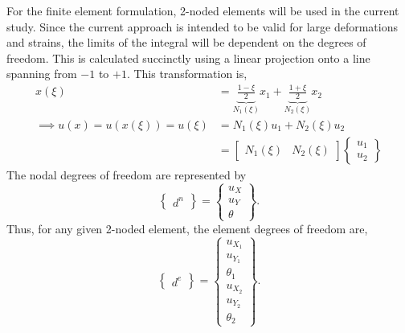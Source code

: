 \documentclass[10pt]{article}
\begin{document}
For the finite element formulation, 2-noded elements will be used in
the current study. Since the current approach is intended to be valid
for large deformations and strains, the limits of the integral will be
dependent on the degrees of freedom. This is calculated succinctly
using a linear projection onto a line spanning from $-1$ to $+1$. This
transformation is,
\begin{align}
  x(\xi) &= \underbrace{\frac{1-\xi}{2}}_{N_1(\xi)}x_1 +
           \underbrace{\frac{1+\xi}{2}}_{N_2(\xi)}x_2\nonumber\\
  \implies u(x) = u(x(\xi)) = u(\xi) &= N_1(\xi)u_1 +
                                       N_2(\xi)u_2\nonumber\\
         &= \begin{bmatrix}N_1(\xi) &
           N_2(\xi)\end{bmatrix} \begin{Bmatrix}
           u_1\\u_2 \end{Bmatrix}\label{eq:isopar}
\end{align}
The nodal degrees of freedom are represented by
\begin{equation}
  \begin{Bmatrix} d^n \end{Bmatrix} = \begin{Bmatrix} u_{X}\\ u_{Y}\\
    \theta \end{Bmatrix}.
    \label{eq:ndofs}
\end{equation}
Thus, for any given 2-noded element, the element degrees of freedom
are,
\begin{equation}
  \label{eq:1}
  \begin{Bmatrix} d^e \end{Bmatrix} = \begin{Bmatrix} u_{X_1}\\ u_{Y_1}\\
    \theta_1\\ u_{X_2}\\ u_{Y_2}\\ \theta_2 \end{Bmatrix}.
\end{equation}
\end{document}
